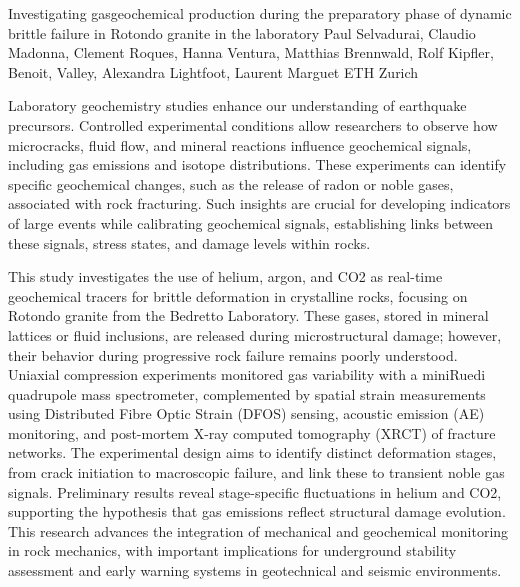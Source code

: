 \begin{conf-abstract}
{Investigating gasgeochemical production during the preparatory phase of dynamic brittle failure in Rotondo granite in the laboratory}
{Paul Selvadurai, Claudio Madonna, Clement Roques, Hanna Ventura, Matthias Brennwald, Rolf Kipfler, Benoit, Valley, Alexandra Lightfoot, Laurent Marguet}
{ETH Zurich}
{Laboratory geochemistry studies enhance our understanding of earthquake precursors. Controlled experimental conditions allow researchers to observe how microcracks, fluid flow, and mineral reactions influence geochemical signals, including gas emissions and isotope distributions. These experiments can identify specific geochemical changes, such as the release of radon or noble gases, associated with rock fracturing. Such insights are crucial for developing indicators of large events while calibrating geochemical signals, establishing links between these signals, stress states, and damage levels within rocks.

This study investigates the use of helium, argon, and CO2 as real-time geochemical tracers for brittle deformation in crystalline rocks, focusing on Rotondo granite from the Bedretto Laboratory. These gases, stored in mineral lattices or fluid inclusions, are released during microstructural damage; however, their behavior during progressive rock failure remains poorly understood. Uniaxial compression experiments monitored gas variability with a miniRuedi quadrupole mass spectrometer, complemented by spatial strain measurements using Distributed Fibre Optic Strain (DFOS) sensing, acoustic emission (AE) monitoring, and post-mortem X-ray computed tomography (XRCT) of fracture networks. The experimental design aims to identify distinct deformation stages, from crack initiation to macroscopic failure, and link these to transient noble gas signals. Preliminary results reveal stage-specific fluctuations in helium and CO2, supporting the hypothesis that gas emissions reflect structural damage evolution. This research advances the integration of mechanical and geochemical monitoring in rock mechanics, with important implications for underground stability assessment and early warning systems in geotechnical and seismic environments.}
\end{conf-abstract}
